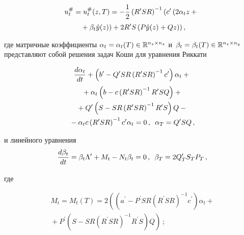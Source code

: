 \begin{multicols}{2}
\noindent
     \begin{multline}
     u_t^{\#} =u_t^{\#}(z,T) =-\displaystyle\frac{\displaystyle 1\mathstrut}{\displaystyle 2\mathstrut} \left( R^\prime SR\right)^{-1} \left(
 c^\prime \left( 2\alpha_t z+{}\right.\right.\\
\left.\left.{}+\beta_t \hat{y}(z)\right) +2R^\prime S\left( 
P\hat{y}(z) +Qz\right)\right),
     \label{e8-bos}
     \end{multline}
     
     \vspace*{-2pt}

\noindent
где матричные коэффициенты $\alpha_t \hm= \alpha_t(T)\hm\in 
\mathbb{R}^{n_z\times n_z}$ и~$\beta_t\hm= \beta_t(T)\hm\in 
\mathbb{R}^{n_z\times n_y}$ {представляют собой} решения задач 
Коши для уравнения Риккати

\vspace*{-6pt}

\noindent
\begin{multline}
\displaystyle\frac{\displaystyle d\alpha_t\mathstrut}{\displaystyle dt\mathstrut} +\left( b^\prime - Q^\prime SR\left( R^\prime SR\right)^{-1} 
c^\prime\right)\alpha_t+{}\\
{}+ \alpha_t\left( b-c\left( R^\prime SR\right)^{-1} R^\prime SQ\right)+{}\\
{}+ Q^\prime \left( S-SR\left(R^\prime SR\right)^{-1} R^\prime S\right)Q -{}\\
{}-
\alpha_t c \left( R^\prime SR\right)^{-1} c^\prime \alpha_t =0\,,\enskip 
\alpha_T=Q^\prime SQ\,,
\label{e9-bos}
\end{multline}

\vspace*{-4pt}

\noindent
и линейного уравнения
\begin{equation}
\displaystyle\frac{\displaystyle d\beta_t\mathstrut}{\displaystyle dt\mathstrut}= \beta_t\Lambda^\prime +M_t -N_t\beta_t=0\,,\enskip
\beta_T=2Q^\prime_T S_T P_T\,,
\label{e10-bos}
\end{equation}

\vspace*{-2pt}

\noindent
где

\vspace*{-7pt}

\noindent
\begin{multline*}
M_t= M_t(T) =2\left(\left( a^\prime -P^\prime SR \left( R^\prime SR\right)^{-1} 
c^\prime \right) \alpha_t +{}\right.\\[-1pt]
\left.{}+P^\prime \left( S-SR\left( R^\prime SR\right)^{-1} R^\prime S\right) 
Q\right)\,;
\end{multline*}


\end{multicols}
